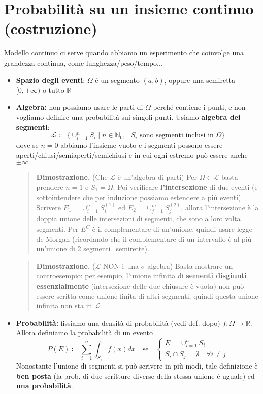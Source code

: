 \documentclass[a4paper,10pt]{article}
\newcommand{\re}{\mathbb{R}} %
\theoremstyle{remark}
\theoremstyle{definition}
\newenvironment{dimo}{\begin{quote}\textbf{Dimostrazione.}}{\end{quote}} %
\begin{document}
\section{Probabilità su un insieme continuo (costruzione)}
Modello continuo ci serve quando abbiamo un esperimento che coinvolge una grandezza continua, come lunghezza/peso/tempo...
\begin{itemize}
    \item \textbf{Spazio degli eventi}: $\Omega$ è un segmento $(a,b)$, oppure una semiretta $[0,+\infty)$ o tutto $\re$
    \item \textbf{Algebra:} non possiamo usare le parti di $\Omega$ perché contiene i punti, e non vogliamo definire una probabilità sui singoli punti. Usiamo \textbf{algebra dei segmenti}:
    $$\mathscr{L}\coloneqq\{\cup_{i=1}^n S_i \mid n\in \mathbb{N}_0, \text{ $S_i$ sono segmenti inclusi in 
 $\Omega$}\}$$
 dove se $n=0$ abbiamo l'insieme vuoto e i segmenti possono essere aperti/chiusi/semiaperti/semichiusi e in cui ogni estremo può essere anche $\pm\infty$ 

\begin{dimo}
    (Che $\mathscr{L}$ è un'algebra di parti) Per $\Omega \in \mathscr{L}$ basta prendere $n=1$ e $S_1=\Omega$. Poi verificare \textbf{l'intersezione} di due eventi (e sottointendere che per induzione possiamo estendere a più eventi). Scrivere $E_1 = \cup_{i=1}^n S_i^{(1)}$ ed $E_2 = \cup_{j=1}^m S_j^{(2)}$, allora l'intersezione è la doppia unione delle intersezioni di segmenti, che sono a loro volta segmenti. Per $E^C$ è il complementare di un'unione, quindi usare legge de Morgan (ricordando che il complementare di un intervallo è al più un'unione di 2 segmenti=semirette). 
\end{dimo}

\begin{dimo}
    ($\mathscr{L}$ NON è una $\sigma$-algebra) Basta mostrare un controesempio: per esempio, l'unione infinita di \textbf{sementi disgiunti essenzialmente} (intersezione delle due chiusure è vuota) non può essere scritta come unione finita di altri segmenti, quindi questa unione infinita non sta in $\mathscr{L}$.
\end{dimo}

\item \textbf{Probabilità:} fissiamo una densità di probabilità (vedi def. dopo) $f:\Omega \to \re$. Allora definiamo la probabilità di un evento
$$P(E)\coloneqq\sum_{i=1}^n\int_{S_i}f(x)dx \quad \text{se} \quad
\begin{cases}
    E=\cup_{i=1}^nS_i \\
    S_i\cap S_j=\emptyset \quad \forall i\ne j
\end{cases}
$$
Nonostante l'unione di segmenti si può scrivere in più modi, tale definizione è \textbf{ben posta} (la prob. di due scritture diverse della stessa unione è uguale) ed \textbf{una probabilità}.


\end{itemize}
\end{document}
